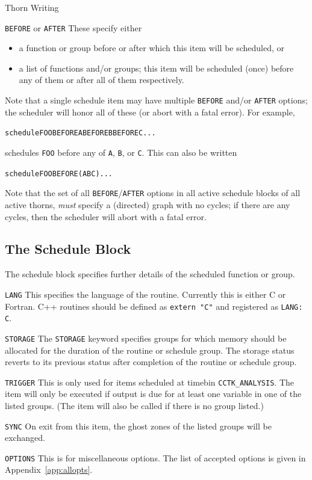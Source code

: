 \begin{cactuspart}{Thorn Writing}
\begin{Lentry}
\item[\texttt{BEFORE} or \texttt{AFTER}]
These specify either
\begin{itemize}
\item   a function or group before or after which this item will be
        scheduled, or
\item   a list of functions and/or groups; this item will be scheduled
        (once) before any of them or after all of them respectively.
\end{itemize}
Note that a single schedule item may have multiple \texttt{BEFORE}
and/or \texttt{AFTER} options; the scheduler will honor all of these
(or abort with a fatal error).  For example,
\begin{alltt}
schedule FOO BEFORE A BEFORE B BEFORE C ...
\end{alltt}
schedules \texttt{FOO} before any of \texttt{A}, \texttt{B}, or \texttt{C}.
This can also be written
\begin{alltt}
schedule FOO BEFORE (A B C) ...
\end{alltt}

Note that the set of all \texttt{BEFORE}/\texttt{AFTER} options in
all active schedule blocks of all active thorns, \emph{must} specify
a (directed) graph with no cycles; if there are any cycles, then the
scheduler will abort with a fatal error.
\end{Lentry}


\subsection{The Schedule Block}
\label{scheduling:schedule_block}

The schedule block specifies further details of the scheduled function
or group.

\begin{Lentry}
\item[\texttt{LANG}]
This specifies the language of the routine.  Currently this is either
C or Fortran. C++ routines should be defined as \texttt{extern "C"}
and registered as \texttt{LANG: C}.
\item[\texttt{STORAGE}] The \texttt{STORAGE} keyword specifies groups for
which memory should be allocated for the duration of the routine or
schedule group.  The storage status reverts to its previous status
after completion of the routine or schedule group.
\item[\texttt{TRIGGER}]
This is only used for items scheduled at timebin \texttt{CCTK\_ANALYSIS}.
The item will only be executed if output is due for at least one
variable in one of the listed groups.  (The item will also be called
if there is no group listed.)
\item[\texttt{SYNC}]
On exit from this item, the ghost zones of the listed groups will be
exchanged.
\item[\texttt{OPTIONS}]
This is for miscellaneous options.  The list of accepted options is
given in Appendix~\ref{app:allopts}.
\end{Lentry}


\end{cactuspart}
